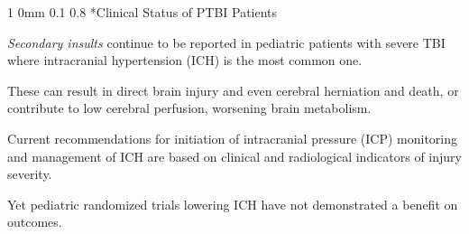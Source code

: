 \documentclass[12pt]{article}
\makeatletter
\newcommand{\9}{\\[9pt]}
\newcommand{\bgm}{\color{MyMath}}
\newcommand{\egm}{\color{white}}
\renewcommand{\section}{\@startsection
	    {section}%
	    {1}%
	    {0mm}%
	    {0.1\baselineskip}%
	    {0.8\baselineskip}%
	    {\newpage \color[cmyk]{0.43,0,0.01,0} \center\LARGE}}%
\makeatother
\begin{document}
\begin{landscape}
\begin{Large}
{\begin{comment}
\section*{Analysis of First Differences}
\begin{ohlist}
    \item   Select two levels of one explanatory variable and setting all others at their means: 
            \bgm$\mathbf{X}_1$ and $\mathbf{X}_2$\egm.  
    \item   Two hypothetical probability vectors are created by applying the link function to
            \bgm$\mathbf{X}_1\boldsymbol{\beta}$\egm\
            and \bgm$\mathbf{X}_2\boldsymbol{\beta}$\egm, which can be compared.  
    \item   Race is set at white, etiology is set at motor vehicle accident, and the two vectors are then made 
            different with the Group variable: one indicates Pre-PNCP and the other indicates Post-PNCP status.  
    \item   All other variables except Group, Race and Etiology are set at the data means.
    \item   These almost identical cases are multiplied by the estimated regression coefficient vector 
            and the ordered probit link function then transforms each onto the probability scale for comparison.  
    \item   The probability of death falls 53\% following PNCP initiation (from \bgm$0.210$\egm\ to \bgm$0·0988$\egm) 
            and the probability for discharge to home with no assistance increases 53\% (from \bgm$0.101$\egm\ to 
            \bgm$0.214$\egm). 
\end{ohlist}
\end{comment}

\section*{Clinical Status of PTBI Patients}
\begin{ohlist}
    \item   \emph{Secondary insults} continue to be reported in pediatric patients with severe TBI where intracranial hypertension
            (ICH) is the most common one. 
    \item   These can result in direct brain injury and even cerebral herniation and death, or contribute to low cerebral perfusion, 
            worsening brain metabolism. 
    \item   Current recommendations for initiation of intracranial pressure (ICP) monitoring and management of ICH are based on 
            clinical and radiological indicators of injury severity. 
    \item   Yet pediatric randomized trials lowering ICH have not demonstrated a benefit on outcomes. 
\end{ohlist}

}
\end{Large}
\end{landscape}
\end{document}
